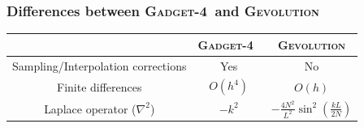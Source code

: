 \documentclass{beamer}
\makeatletter
\newcommand{\mylabel}{%
}
\newcommand{\gadget}{\textsc{Gadget-4}}
\newcommand{\gevolution}{\textsc{Gevolution}}
\makeatother
\begin{document}
\begin{frame}[label=differencesPM]
	\frametitle{Differences between \gadget\ and \gevolution\mylabel}
	\begin{tabular}{ccc}
		& \gadget\ & \gevolution \\
		\hline
		Sampling/Interpolation corrections & Yes & No \\
		Finite differences & $O(h^4)$ & $O(h)$ \\
		Laplace operator ($\nabla^2$) & $-k^2 $
			& $- \frac{4 N^2}{L^2}\sin^2 \left(\frac{k L}{2N}\right) $\\
	\end{tabular}
\end{frame}
\end{document}
